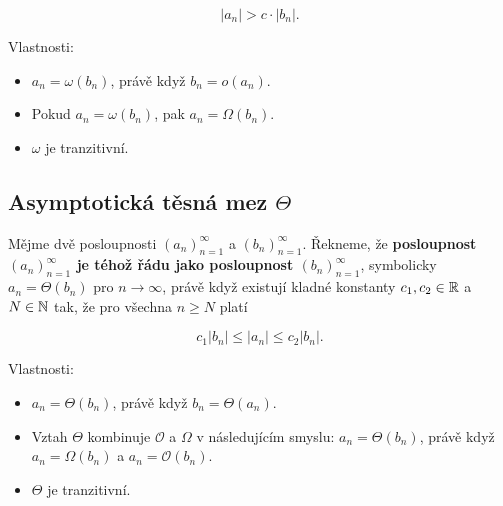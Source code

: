 \[ |a_n| > c \cdot |b_n|. \]

\noindent Vlastnosti:

\begin{itemize}
    \item  $a_n = \omega(b_n)$, právě když $b_n = o(a_n)$.
    \item Pokud $a_n = \omega(b_n)$, pak $a_n = \Omega(b_n)$.
    \item $\omega$ je tranzitivní.
\end{itemize}

\subsection*{Asymptotická těsná mez $\Theta$}

Mějme dvě posloupnosti $(a_n)_{n=1}^\infty$ a $(b_n)_{n=1}^\infty$. Řekneme, že
\textbf{posloupnost $(a_n)_{n=1}^\infty$ je téhož řádu jako posloupnost
    $(b_n)_{n=1}^\infty$}, symbolicky $a_n = \Theta(b_n)$ pro $n \to \infty$, právě
když existují kladné konstanty $c_1,c_2 \in \mathbb{R}$ a $N \in \mathbb{N}$ tak, že pro
všechna $n \geq N$ platí

\[ c_1 |b_n| \leq |a_n| \leq c_2 |b_n|. \]

\noindent Vlastnosti:

\begin{itemize}
    \item $a_n = \Theta(b_n)$, právě když $b_n = \Theta(a_n)$.
    \item Vztah $\Theta$ kombinuje $\mathcal{O}$ a $\Omega$ v následujícím smyslu: $a_n =
              \Theta(b_n)$, právě když $a_n = \Omega(b_n)$ a $a_n = \mathcal{O}(b_n)$.
    \item $\Theta$ je tranzitivní.
\end{itemize}

\pagebreak

